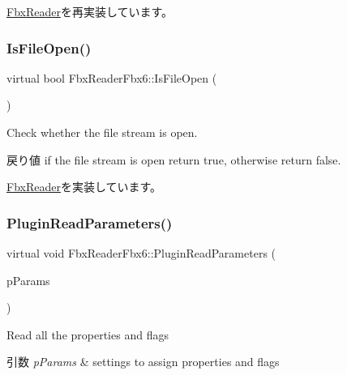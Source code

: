 \hyperlink{class_fbx_reader_aa16aacbaa1c1e16fc208624b55dd6767}{Fbx\+Reader}を再実装しています。

\mbox{\label{class_fbx_reader_fbx6_a430304edb9e06837faacd6f25a0ed714}} 
\subsubsection{\texorpdfstring{Is\+File\+Open()}{IsFileOpen()}}
{\footnotesize\ttfamily virtual bool Fbx\+Reader\+Fbx6\+::\+Is\+File\+Open (\begin{DoxyParamCaption}{ }\end{DoxyParamCaption})\hspace{0.3cm}{\ttfamily [virtual]}}

Check whether the file stream is open. \begin{DoxyReturn}{戻り値}
if the file stream is open return {\ttfamily true}, otherwise return {\ttfamily false}. 
\end{DoxyReturn}


\hyperlink{class_fbx_reader_af86b437702ffc840cfab52185cbc7232}{Fbx\+Reader}を実装しています。

\mbox{\label{class_fbx_reader_fbx6_a1a3544b766bd03dc4b1141ba4f93b03f}} 
\subsubsection{\texorpdfstring{Plugin\+Read\+Parameters()}{PluginReadParameters()}}
{\footnotesize\ttfamily virtual void Fbx\+Reader\+Fbx6\+::\+Plugin\+Read\+Parameters (\begin{DoxyParamCaption}\item[{\hyperlink{class_fbx_object}{Fbx\+Object} \&}]{p\+Params }\end{DoxyParamCaption})\hspace{0.3cm}{\ttfamily [virtual]}}

Read all the properties and flags 
\begin{DoxyParams}{引数}
{\em p\+Params} & settings to assign properties and flags \\
\hline
\end{DoxyParams}


